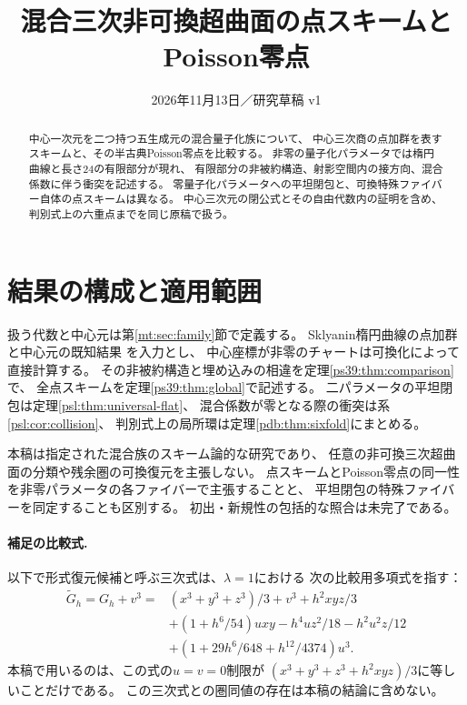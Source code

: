 
\title{混合三次非可換超曲面の点スキームとPoisson零点}
\author{}
\date{2026年11月13日／研究草稿 v1}

\maketitle
\begin{abstract}
中心一次元を二つ持つ五生成元の混合量子化族について、
中心三次商の点加群を表すスキームと、その半古典Poisson零点を比較する。
非零の量子化パラメータでは楕円曲線と長さ24の有限部分が現れ、
有限部分の非被約構造、射影空間内の接方向、混合係数に伴う衝突を記述する。
零量子化パラメータへの平坦閉包と、可換特殊ファイバー自体の点スキームは異なる。
中心三次元の閉公式とその自由代数内の証明を含め、
判別式上の六重点までを同じ原稿で扱う。
\end{abstract}

\section*{結果の構成と適用範囲}
扱う代数と中心元は第\ref{mt:sec:family}節で定義する。
Sklyanin楕円曲線の点加群と中心元の既知結果
\cite{PSPSmithTate,PSPDeLaet}を入力とし、
中心座標が非零のチャートは可換化によって直接計算する。
その非被約構造と埋め込みの相違を定理\ref{ps39:thm:comparison}で、
全点スキームを定理\ref{ps39:thm:global}で記述する。
二パラメータの平坦閉包は定理\ref{psl:thm:universal-flat}、
混合係数が零となる際の衝突は系\ref{psl:cor:collision}、
判別式上の局所環は定理\ref{pdb:thm:sixfold}にまとめる。

本稿は指定された混合族のスキーム論的な研究であり、
任意の非可換三次超曲面の分類や残余圏の可換復元を主張しない。
点スキームとPoisson零点の同一性を非零パラメータの各ファイバーで主張することと、
平坦閉包の特殊ファイバーを同定することも区別する。
初出・新規性の包括的な照合は未完了である。



\paragraph{補足の比較式.}
以下で形式復元候補と呼ぶ三次式は、$\lambda=1$における
次の比較用多項式を指す：
\begin{equation}\label{ps:comparison-cubic}
\begin{split}
 \widetilde G_h=G_h+v^3={}&(x^3+y^3+z^3)/3+v^3+h^2xyz/3\\
 &+(1+h^6/54)uxy-h^4uz^2/18-h^2u^2z/12\\
 &+(1+29h^6/648+h^{12}/4374)u^3.
\end{split}
\end{equation}
本稿で用いるのは、この式の$u=v=0$制限が
$(x^3+y^3+z^3+h^2xyz)/3$に等しいことだけである。
この三次式との圏同値の存在は本稿の結論に含めない。

